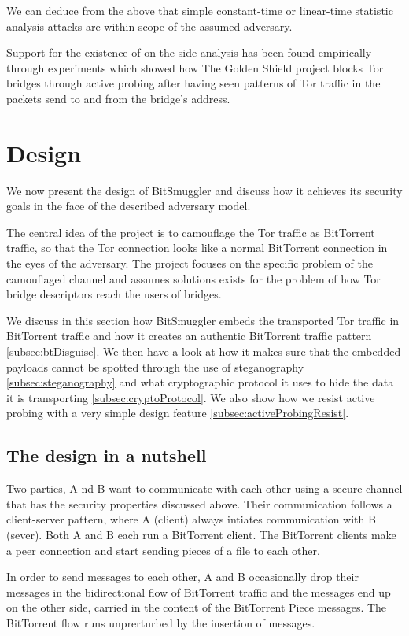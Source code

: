 \documentclass[11pt]{book} %
\newcommand{\projectName}{BitSmuggler }
\begin{document}
We can deduce from the above that simple constant-time  or linear-time statistic analysis attacks are within scope of the assumed adversary.

Support for the existence of on-the-side analysis has been found empirically through experiments which showed how The Golden Shield project blocks Tor bridges through active probing after having seen patterns of Tor traffic in the packets send to and from the bridge's address.

\section{Design}
We now present the design of  \projectName and discuss how it achieves its security goals in the face of the described adversary model.

The central idea of the project is to camouflage the Tor traffic as BitTorrent traffic, so that the Tor connection looks like a normal BitTorrent connection in the eyes of the adversary. The project focuses on the specific problem of the camouflaged channel and assumes solutions exists for the problem of how Tor bridge descriptors reach the users of bridges.

We discuss in this section how \projectName embeds the transported Tor traffic in BitTorrent traffic and how it creates an authentic BitTorrent traffic pattern  \ref{subsec:btDisguise}. We then have a look at how it makes sure that the embedded payloads cannot be spotted through the use of steganography  \ref{subsec:steganography} and what cryptographic protocol it uses to hide the data it is transporting  \ref{subsec:cryptoProtocol}. We also show how we resist active probing with a very simple design feature 
 \ref{subsec:activeProbingResist}.

\subsection{The design in a nutshell}

Two parties, A nd B want to communicate with each other using a secure channel that has the security properties discussed above.  Their communication follows a client-server pattern, where A (client) always intiates communication with B (sever). Both A and B each run a BitTorrent client. The BitTorrent clients make a peer connection and start sending pieces of a file to each other.

In order to send messages to each other, A and B occasionally drop their messages in the bidirectional flow of BitTorrent traffic and the messages end up on the other side, carried in the content of the BitTorrent Piece messages. The BitTorrent flow runs unprerturbed by the insertion of messages. 
\end{document}
